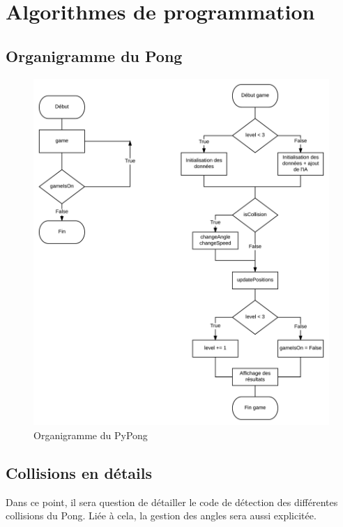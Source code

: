 \section{Algorithmes de programmation}
\label{sec:algor-de-progr}

\subsection{Organigramme du Pong}
\label{sec:organigramme}

\begin{figure}[!h]
  \centering
  \includegraphics[scale=0.4]
  {textures/images/algorithm/organigram.pdf}
  \caption{Organigramme du PyPong}
  \label{fig:organigram}
\end{figure}

\newpage

\subsection{Collisions en détails}
\label{sec:collisions-details}

Dans ce point, il sera question de détailler le code de détection des différentes
collisions du Pong. Liée à cela, la gestion des angles sera aussi explicitée.

